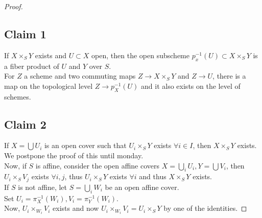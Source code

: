 \documentclass[../main.tex]{subfiles}
\begin{document}
\begin{proof}
	\subsection*{Claim 1}
If $X\times_S Y$ exists and $U \subset X$ open, then the open subscheme
$p_x^{-1}( U) \subset X\times_S Y$ is a fiber product of $U$ and $Y$ over $S$.\\
For $Z$ a scheme and two commuting maps $Z\to X\times_S Y$ and $Z\to U$, there is a map on the topological level $Z\to p_X^{-1}( U) $ and it also exists on the level of schemes.
\subsection*{Claim 2}
If $X= \bigcup U_i$ is an open cover such that $U_i \times_S Y$ exists $\forall i \in I$, then $X\times_S Y$ exists.\\
We postpone the proof of this until monday.\\

Now, if $S$ is affine, consider the open affine covers $X= \bigcup_i U_i , Y = \bigcup V_i$, then $U_i \times_S V_j$ exists $\forall i,j$, thus $U_i \times_S Y$ exists $\forall i$ and thus $X\times_S Y$ exists.\\

If $S$ is not affine, let $S= \bigcup_i W_i$ be an open affine cover.\\
Set $U_i = \pi_X^{-1}( W_i) , V_i = \pi_Y^{-1}( W_i) $.\\
Now, $U_i \times_{W_i} V_i$ exists and now $U_i \times_{W_i} V_i = U_i \times_S Y$ by one of the identities.
\end{proof}






	
\end{document}
